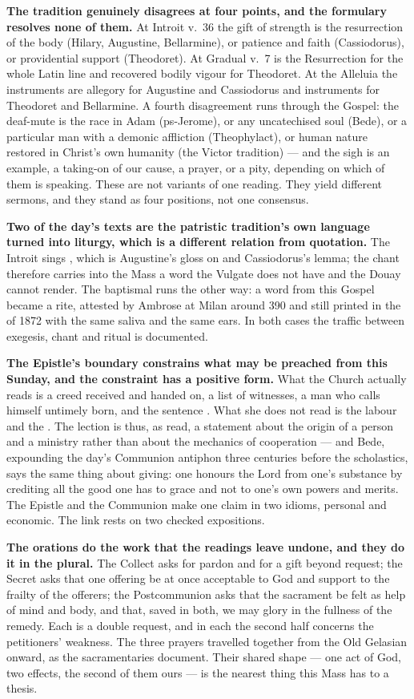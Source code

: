 \textbf{The tradition genuinely disagrees at four points, and the formulary
resolves none of them.} At Introit v.~36 the gift of strength is the
resurrection of the body (Hilary, Augustine, Bellarmine), or patience and faith
(Cassiodorus), or providential support (Theodoret). At Gradual v.~7
 is the Resurrection for the whole Latin line and recovered
bodily vigour for Theodoret. At the Alleluia the instruments are allegory for
Augustine and Cassiodorus and instruments for Theodoret and Bellarmine. A
fourth disagreement runs through the Gospel: the deaf-mute is the race in Adam
(ps-Jerome), or any uncatechised soul (Bede), or a particular man with a
demonic affliction (Theophylact), or human nature restored in Christ's own
humanity (the Victor tradition) --- and the sigh is an example, a taking-on of
our cause, a prayer, or a pity, depending on which of them is speaking. These
are not variants of one reading. They yield different sermons, and they stand
as four positions, not one consensus.

\textbf{Two of the day's texts are the patristic tradition's own language
turned into liturgy, which is a different relation from quotation.} The
Introit sings , which is Augustine's gloss on  and Cassiodorus's lemma; the chant therefore carries into the Mass a word
the Vulgate does not have and the Douay cannot render. The baptismal
 runs the other way: a word from this Gospel became a rite,
attested by Ambrose at Milan around 390 and still printed in the
 of 1872 with the same saliva and the same ears. In both
cases the traffic between exegesis, chant and ritual is documented.

\textbf{The Epistle's boundary constrains what may be preached from this
Sunday, and the constraint has a positive form.} What the Church
actually reads is a creed received and handed on, a list of witnesses, a man
who calls himself untimely born, and the sentence . What she does not read is the labour and the . The lection
is thus, as read, a statement about the origin of a person and a ministry
rather than about the mechanics of cooperation --- and Bede, expounding the
day's Communion antiphon three centuries before the scholastics, says the same
thing about giving: one honours the Lord from one's substance by crediting all
the good one has to grace and not to one's own powers and merits. The Epistle and the
Communion make one claim in two idioms, personal and economic. The link
rests on two checked expositions.

\textbf{The orations do the work that the readings leave undone, and they do it
in the plural.} The Collect asks for pardon and for a gift beyond request; the
Secret asks that one offering be at once acceptable to God and support to the
frailty of the offerers; the Postcommunion asks that the sacrament be felt as
help of mind and body, and that, saved in both, we may glory in the fullness of
the remedy. Each is a double request, and in each the second half concerns the
petitioners' weakness. The three prayers travelled together from the Old
Gelasian onward, as the sacramentaries document. Their shared shape
--- one act of God, two effects, the second of them ours --- is the nearest
thing this Mass has to a thesis.
